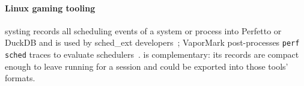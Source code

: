 \paragraph{Linux gaming tooling} systing records all scheduling events of a
system or process into Perfetto or DuckDB and is used by sched\_ext
developers~\cite{systing}; VaporMark post-processes \texttt{perf sched}
traces to evaluate schedulers~\cite{vapormark,scx}. \sys is complementary:
its records are compact enough to leave running for a session and could be
exported into those tools' formats.
